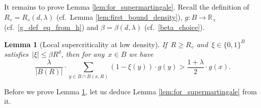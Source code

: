 \documentclass[a4paper,12pt]{article}
\newtheorem  {lemma}         [theorem]{Lemma}
\begin{document}
It remains to prove Lemma \ref{lem:for_supermartingale}.
Recall the definition of $R_\diamond=R_\diamond(d,\lambda)$ (cf.\ Lemma \ref{lem:first_bound_density}), $g: B \to \mathbb{R}_+$ (cf.\ \eqref{g_def_eq_from_h})
and $\beta=\beta(d,\lambda)$ (cf.\ \eqref{beta_choice}).
\begin{lemma}[Local supercriticality at low density]
\label{lem:low_density}   If~$R \ge R_\diamond$  and~$\xi \in \{0,1\}^B$ satisfies~$|\xi| \leq \beta R^d$, then for any~$x \in B$ we have
\begin{equation}\label{eq:lower_bound_with_density}
\frac{\lambda}{|B(R)|} \cdot \sum_{y \in B \cap B(x,R)}  (1-\xi(y))\cdot g(y) > \frac{1+ \lambda}{2} \cdot g(x).
\end{equation}
\end{lemma}

Before we prove Lemma \ref{lem:low_density}, let us deduce Lemma \ref{lem:for_supermartingale} from it.
\end{document}
